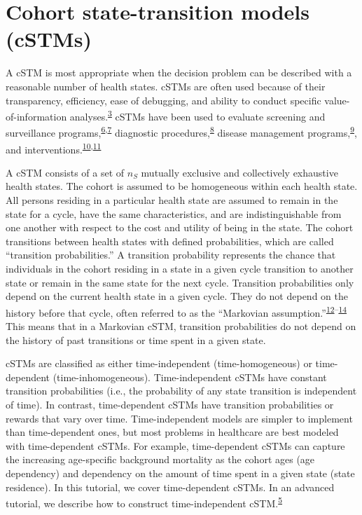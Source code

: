 \documentclass[
]{article}
\begin{document}
\hypertarget{cohort-state-transition-models-cstms}{%
\section{Cohort state-transition models (cSTMs)}\label{cohort-state-transition-models-cstms}}

A cSTM is most appropriate when the decision problem can be described with a reasonable number of health states. cSTMs are often used because of their transparency, efficiency, ease of debugging, and ability to conduct specific value-of-information analyses.\textsuperscript{\protect\hyperlink{ref-Siebert2012c}{3}} cSTMs have been used to evaluate screening and surveillance programs,\textsuperscript{\protect\hyperlink{ref-Suijkerbuijk2018}{6},\protect\hyperlink{ref-Sathianathen2018a}{7}} diagnostic procedures,\textsuperscript{\protect\hyperlink{ref-Lu2018b}{8}} disease management programs,\textsuperscript{\protect\hyperlink{ref-Djatche2018}{9}}, and interventions.\textsuperscript{\protect\hyperlink{ref-Pershing2014}{10},\protect\hyperlink{ref-Smith-Spangler2010}{11}}

A cSTM consists of a set of \(n_S\) mutually exclusive and collectively exhaustive health states. The cohort is assumed to be homogeneous within each health state. All persons residing in a particular health state are assumed to remain in the state for a cycle, have the same characteristics, and are indistinguishable from one another with respect to the cost and utility of being in the state. The cohort transitions between health states with defined probabilities, which are called ``transition probabilities.'' A transition probability represents the chance that individuals in the cohort residing in a state in a given cycle transition to another state or remain in the same state for the next cycle. Transition probabilities only depend on the current health state in a given cycle. They do not depend on the history before that cycle, often referred to as the ``Markovian assumption.''\textsuperscript{\protect\hyperlink{ref-Kuntz2001}{12}--\protect\hyperlink{ref-Beck1983}{14}} This means that in a Markovian cSTM, transition probabilities do not depend on the history of past transitions or time spent in a given state.

cSTMs are classified as either time-independent (time-homogeneous) or time-dependent (time-inhomogeneous). Time-independent cSTMs have constant transition probabilities (i.e., the probability of any state transition is independent of time). In contrast, time-dependent cSTMs have transition probabilities or rewards that vary over time. Time-independent models are simpler to implement than time-dependent ones, but most problems in healthcare are best modeled with time-dependent cSTMs. For example, time-dependent cSTMs can capture the increasing age-specific background mortality as the cohort ages (age dependency) and dependency on the amount of time spent in a given state (state residence). In this tutorial, we cover time-dependent cSTMs. In an advanced tutorial, we describe how to construct time-independent cSTM.\textsuperscript{\protect\hyperlink{ref-Alarid-Escudero2021b}{5}}
\end{document}
